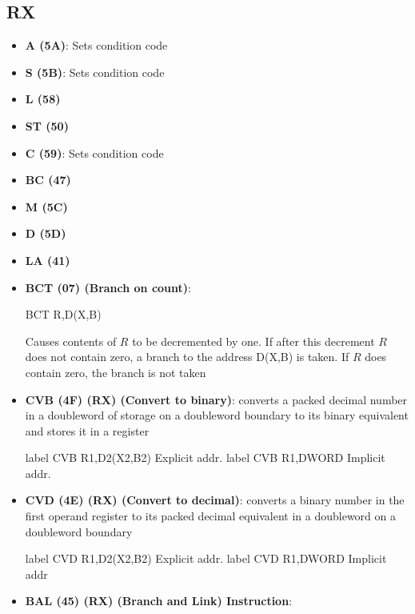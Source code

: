 \documentclass{report}
\begin{document}
    \subsection{RX}
    \begin{itemize}
        \item \textbf{A (5A)}: Sets condition code
        \item \textbf{S (5B)}: Sets condition code
        \item \textbf{L (58)}
        \item \textbf{ST (50)}
        \item \textbf{C (59)}: Sets condition code
        \item \textbf{BC (47)}
        \item \textbf{M (5C)}
        \item \textbf{D (5D)}
        \item \textbf{LA (41)}
        \item \textbf{BCT (07) (Branch on count)}:
            \bigbreak \noindent 
            \begin{cppcode}
            BCT   R,D(X,B)
        \end{cppcode}
        \bigbreak \noindent 
        Causes contents of $R$  to be decremented by one. If after this decrement $R$ does not contain zero, a branch to the address D(X,B) is taken. If $R$ does contain zero, the branch is not taken
    \item \textbf{CVB (4F) (RX) (Convert to binary)}: converts a packed decimal number in a doubleword of storage on a doubleword boundary to its binary equivalent and stores it in a register
        \bigbreak \noindent 
        \begin{cppcode}
            label CVB R1,D2(X2,B2) Explicit addr.
            label CVB R1,DWORD Implicit addr.
        \end{cppcode}
    \item \textbf{CVD (4E) (RX) (Convert to decimal)}: converts a binary number in the first operand register to its packed decimal equivalent in a doubleword on a doubleword boundary
        \bigbreak \noindent 
        \begin{cppcode}
            label CVD R1,D2(X2,B2) Explicit addr.
            label CVD R1,DWORD Implicit addr
        \end{cppcode}
        \item \textbf{BAL (45) (RX) (Branch and Link) Instruction}:
            \bigbreak \noindent 
            \begin{cppcode}

\end{cppcode}
\end{itemize}
\end{document}
